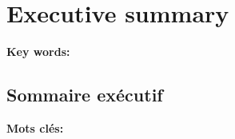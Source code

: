 \chapter*{Executive summary}


\vskip0.5cm
\textbf{Key words: } 
\Keywords

\cleardoublepage
\begin{otherlanguage}{french}
\chapter*{Sommaire exécutif}

\vskip0.5cm
\textbf{Mots clés:} 
\Keywordsfr
\end{otherlanguage}